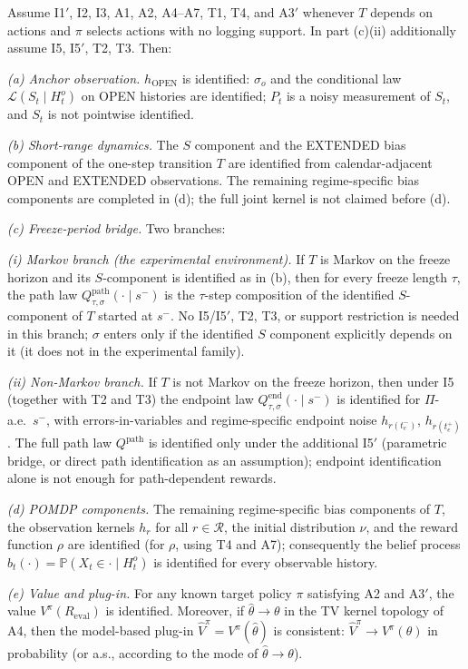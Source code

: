 \begin{aITthm}
Assume I1$'$, I2, I3, A1, A2, A4--A7, T1, T4, and A3$'$ whenever $T$ depends on
actions and $\pi$ selects actions with no logging support.  In part (c)(ii)
additionally assume I5, I5$'$, T2, T3.  Then:

\emph{(a) Anchor observation.} $h_{\mathrm{OPEN}}$ is identified: $\sigma_o$ and
the conditional law $\mathcal L(S_t\mid H_t^o)$ on OPEN histories are identified;
$P_t$ is a noisy measurement of $S_t$, and $S_t$ is not pointwise identified.

\emph{(b) Short-range dynamics.} The $S$ component and the EXTENDED bias
component of the one-step transition $T$ are identified from calendar-adjacent
OPEN and EXTENDED observations.  The remaining regime-specific bias components
are completed in (d); the full joint kernel is not claimed before (d).

\emph{(c) Freeze-period bridge.} Two branches:

\emph{(i) Markov branch (the experimental environment).} If $T$ is Markov on the
freeze horizon and its $S$-component is identified as in (b), then for every
freeze length $\tau$, the path law
$Q^{\mathrm{path}}_{\tau,\sigma}(\cdot\mid s^-)$ is the $\tau$-step composition
of the identified $S$-component of $T$ started at $s^-$.  No I5/I5$'$, T2, T3, or
support restriction is needed in this branch; $\sigma$ enters only if the
identified $S$ component explicitly depends on it (it does not in the
experimental family).

\emph{(ii) Non-Markov branch.} If $T$ is not Markov on the freeze horizon, then
under I5 (together with T2 and T3) the endpoint law
$Q^{\mathrm{end}}_{\tau,\sigma}(\cdot\mid s^-)$ is identified for $\Pi$-a.e.\
$s^-$, with errors-in-variables and regime-specific endpoint noise
$h_{r(t_e^-)}$, $h_{r(t_e^+)}$.  The full path law $Q^{\mathrm{path}}$ is
identified only under the additional I5$'$ (parametric bridge, or direct path
identification as an assumption); endpoint identification alone is not enough
for path-dependent rewards.

\emph{(d) POMDP components.} The remaining regime-specific bias components of
$T$, the observation kernels $h_r$ for all $r\in\mathcal R$, the initial
distribution $\nu$, and the reward function $\rho$ are identified (for $\rho$,
using T4 and A7); consequently the belief process
$b_t(\cdot)=\mathbb P(X_t\in\cdot\mid H_t^o)$ is identified for every observable
history.

\emph{(e) Value and plug-in.} For any known target policy $\pi$ satisfying A2
and A3$'$, the value $V^\pi(R_{\mathrm{eval}})$ is identified.  Moreover, if
$\hat\theta\to\theta$ in the TV kernel topology of A4, then the model-based
plug-in $\hat V^\pi=V^\pi(\hat\theta)$ is consistent:
$\hat V^\pi\to V^\pi(\theta)$ in probability (or a.s., according to the mode of
$\hat\theta\to\theta$).
\end{aITthm}

